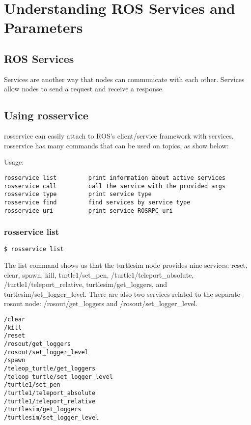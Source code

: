 \section{Understanding ROS Services and Parameters}

\subsection{ROS Services}
Services are another way that nodes can communicate with each other. Services allow nodes to send a request and receive a response.

\subsection{Using rosservice}
rosservice can easily attach to ROS's client/service framework with services. rosservice has many commands that can be used on topics, as show below:

Usage:
\begin{lstlisting}[breaklines=true languages=bash]
rosservice list         print information about active services
rosservice call         call the service with the provided args
rosservice type         print service type
rosservice find         find services by service type
rosservice uri          print service ROSRPC uri
\end{lstlisting}

\subsubsection{rosservice list}

\begin{lstlisting}[breaklines=true languages=bash]
$ rosservice list
\end{lstlisting}

The list command shows us that the turtlesim node provides nine services: reset, clear, spawn, kill, turtle1/set\_pen, /turtle1/teleport\_absolute, /turtle1/teleport\_relative, turtlesim/get\_loggers, and turtlesim/set\_logger\_level. There are also two services related to the separate rosout node: /rosout/get\_loggers and /rosout/set\_logger\_level.

\begin{lstlisting}[breaklines=true languages=bash]
/clear
/kill
/reset
/rosout/get_loggers
/rosout/set_logger_level
/spawn
/teleop_turtle/get_loggers
/teleop_turtle/set_logger_level
/turtle1/set_pen
/turtle1/teleport_absolute
/turtle1/teleport_relative
/turtlesim/get_loggers
/turtlesim/set_logger_level
\end{lstlisting}

